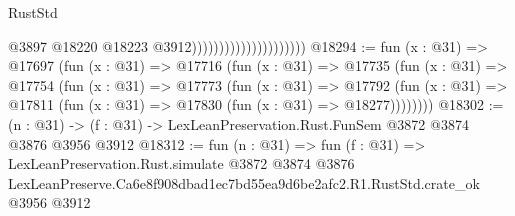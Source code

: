 \begin{lexlean}{RustStd}
\begin{coremodule}
                                              @3897
                                              @18220
                                              @18223
                                              @3912)))))))))))))))))))))
@18294 := fun (x : @31) =>
  @17697
    (fun (x : @31) =>
    @17716
      (fun (x : @31) =>
      @17735
        (fun (x : @31) =>
        @17754
          (fun (x : @31) =>
          @17773
            (fun (x : @31) =>
            @17792
              (fun (x : @31) => @17811 (fun (x : @31) => @17830 (fun (x : @31) => @18277))))))))
@18302 := (n : @31) -> (f : @31) -> LexLeanPreservation.Rust.FunSem @3872 @3874 @3876 @3956 @3912
@18312 := fun (n : @31) =>
  fun (f : @31) =>
  LexLeanPreservation.Rust.simulate
    @3872
    @3874
    @3876
    LexLeanPreserve.Ca6e8f908dbad1ec7bd55ea9d6be2afc2.R1.RustStd.crate_ok
    @3956
    @3912
\end{coremodule}
\end{lexlean}
